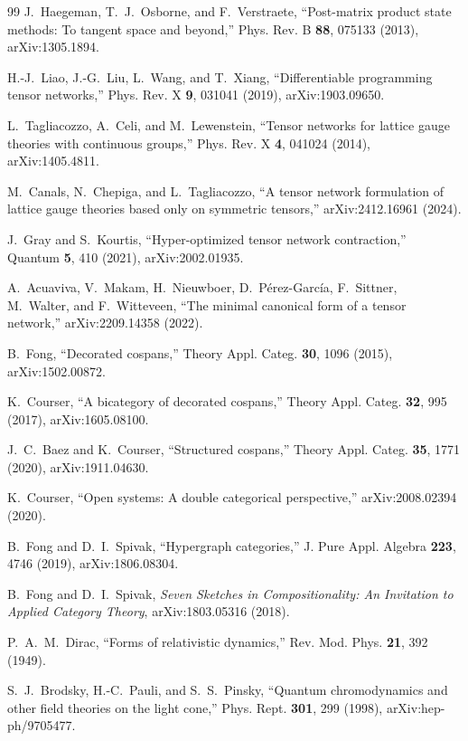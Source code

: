 \documentclass[11pt]{article}
\begin{document}
\begin{thebibliography}{99}
J.~Haegeman, T.~J.~Osborne, and F.~Verstraete,
``Post-matrix product state methods: To tangent space and beyond,''
Phys. Rev. B \textbf{88}, 075133 (2013),
arXiv:1305.1894.

H.-J.~Liao, J.-G.~Liu, L.~Wang, and T.~Xiang,
``Differentiable programming tensor networks,''
Phys. Rev. X \textbf{9}, 031041 (2019),
arXiv:1903.09650.

L.~Tagliacozzo, A.~Celi, and M.~Lewenstein,
``Tensor networks for lattice gauge theories with continuous groups,''
Phys. Rev. X \textbf{4}, 041024 (2014),
arXiv:1405.4811.

M.~Canals, N.~Chepiga, and L.~Tagliacozzo,
``A tensor network formulation of lattice gauge theories based only on
symmetric tensors,''
arXiv:2412.16961 (2024).

J.~Gray and S.~Kourtis,
``Hyper-optimized tensor network contraction,''
Quantum \textbf{5}, 410 (2021),
arXiv:2002.01935.

A.~Acuaviva, V.~Makam, H.~Nieuwboer, D.~P\'erez-Garc\'ia,
F.~Sittner, M.~Walter, and F.~Witteveen,
``The minimal canonical form of a tensor network,''
arXiv:2209.14358 (2022).

B.~Fong,
``Decorated cospans,''
Theory Appl. Categ. \textbf{30}, 1096 (2015),
arXiv:1502.00872.

K.~Courser,
``A bicategory of decorated cospans,''
Theory Appl. Categ. \textbf{32}, 995 (2017),
arXiv:1605.08100.

J.~C.~Baez and K.~Courser,
``Structured cospans,''
Theory Appl. Categ. \textbf{35}, 1771 (2020),
arXiv:1911.04630.

K.~Courser,
``Open systems: A double categorical perspective,''
arXiv:2008.02394 (2020).

B.~Fong and D.~I.~Spivak,
``Hypergraph categories,''
J. Pure Appl. Algebra \textbf{223}, 4746 (2019),
arXiv:1806.08304.

B.~Fong and D.~I.~Spivak,
\emph{Seven Sketches in Compositionality: An Invitation to Applied Category
Theory},
arXiv:1803.05316 (2018).

P.~A.~M.~Dirac,
``Forms of relativistic dynamics,''
Rev. Mod. Phys. \textbf{21}, 392 (1949).

S.~J.~Brodsky, H.-C.~Pauli, and S.~S.~Pinsky,
``Quantum chromodynamics and other field theories on the light cone,''
Phys. Rept. \textbf{301}, 299 (1998),
arXiv:hep-ph/9705477.


\end{thebibliography}
\end{document}
